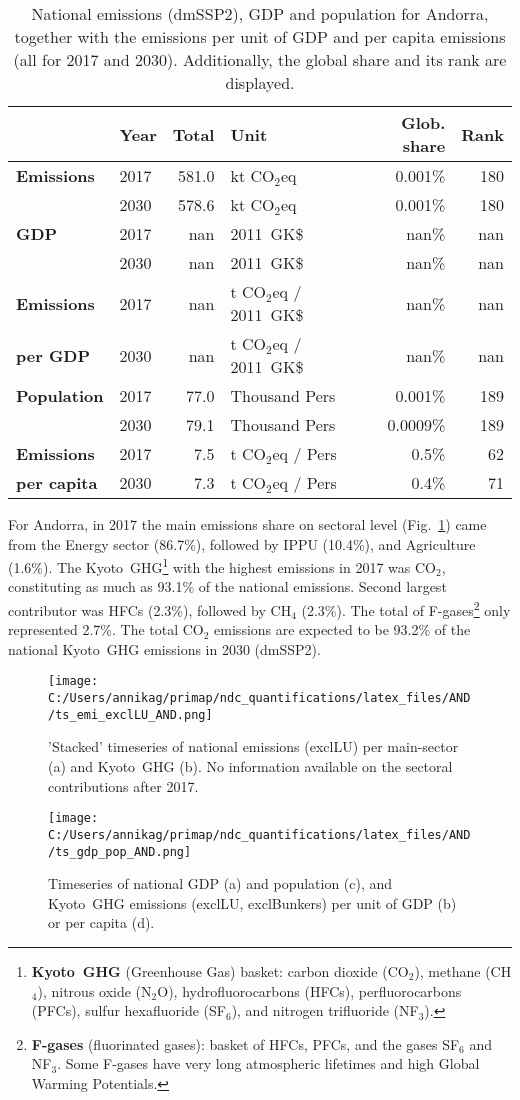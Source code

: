 \documentclass[12pt]{article}
\begin{document}
 \begin{table}[htbp]
 \centering
 \caption{National emissions (dmSSP2), GDP and population for Andorra, together with the emissions per unit of GDP and per capita emissions (all for 2017 and 2030). 
 Additionally, the global share and its rank are displayed.}
 \label{tab:overview}
 \begin{tabular}{l || l r l r r}
 \bfseries  & \bfseries Year & \bfseries Total & \bfseries Unit & \bfseries Glob. share & \bfseries Rank \tabularnewline \hline \hline
 \bfseries Emissions & 2017 & 581.0 & kt CO$_2$eq & 0.001\% & 180 \tabularnewline 
 \bfseries  & 2030 & 578.6 & kt CO$_2$eq & 0.001\% & 180 \tabularnewline \hline
 \bfseries GDP & 2017 & nan &  2011~GK\$ & nan\% & nan \tabularnewline 
 \bfseries  & 2030 & nan &  2011~GK\$ & nan\% & nan \tabularnewline \hline
 \bfseries Emissions & 2017 & nan & t CO$_2$eq /  2011~GK\$ & nan\% & nan \tabularnewline 
 \bfseries per GDP & 2030 & nan & t CO$_2$eq /  2011~GK\$ & nan\% & nan \tabularnewline \hline
 \bfseries Population & 2017 & 77.0 & Thousand Pers & 0.001\% & 189 \tabularnewline 
 \bfseries  & 2030 & 79.1 & Thousand Pers & 0.0009\% & 189 \tabularnewline \hline
 \bfseries Emissions & 2017 & 7.5 & t CO$_2$eq /  Pers & 0.5\% & 62 \tabularnewline 
 \bfseries per capita & 2030 & 7.3 & t CO$_2$eq /  Pers & 0.4\% & 71 \tabularnewline 
 \end{tabular}
 \end{table}

 For Andorra, in 2017 the main emissions share on sectoral level (Fig.~\ref{fig:tsEmi}) came from the Energy sector (86.7\%), followed by IPPU (10.4\%), and Agriculture (1.6\%). 
 The Kyoto~GHG\footnote{\textbf{Kyoto~GHG} (Greenhouse Gas) basket: carbon dioxide (CO$_2$), methane (CH$_4$), nitrous oxide (N$_2$O), hydrofluorocarbons (HFCs), perfluorocarbons (PFCs), sulfur hexafluoride (SF$_6$), and nitrogen trifluoride (NF$_3$).} with the highest emissions in 2017 was CO$_2$, constituting as much as 93.1\% of the national emissions. 
 Second largest contributor was HFCs (2.3\%), followed by CH$_4$ (2.3\%). 
 The total of F-gases\footnote{\textbf{F-gases} (fluorinated gases): basket of HFCs, PFCs, and the gases SF$_6$ and NF$_3$. 
 Some F-gases have very long atmospheric lifetimes and high Global Warming Potentials.} only represented 2.7\%.
 The total CO$_2$ emissions are expected to be 93.2\% of the national Kyoto~GHG emissions in 2030 (dmSSP2).
 \begin{figure}[htbp]
 \centering
 \texttt{[image: C:/Users/annikag/primap/ndc\_quantifications/latex\_files/AND/ts\_emi\_exclLU\_AND.png]}
 \caption{'Stacked' timeseries of national emissions (exclLU) per main-sector (a) and Kyoto~GHG (b). 
 No information available on the sectoral contributions after 2017.}
 \label{fig:tsEmi}
 \end{figure}
 \begin{figure}[htbp]
 \centering
 \texttt{[image: C:/Users/annikag/primap/ndc\_quantifications/latex\_files/AND/ts\_gdp\_pop\_AND.png]}
 \caption{Timeseries of national GDP (a) and population (c), and Kyoto~GHG emissions (exclLU, exclBunkers) per unit of GDP (b) or per capita (d).}
 \label{fig:tsSocioEco}
 \end{figure}
\end{document}
